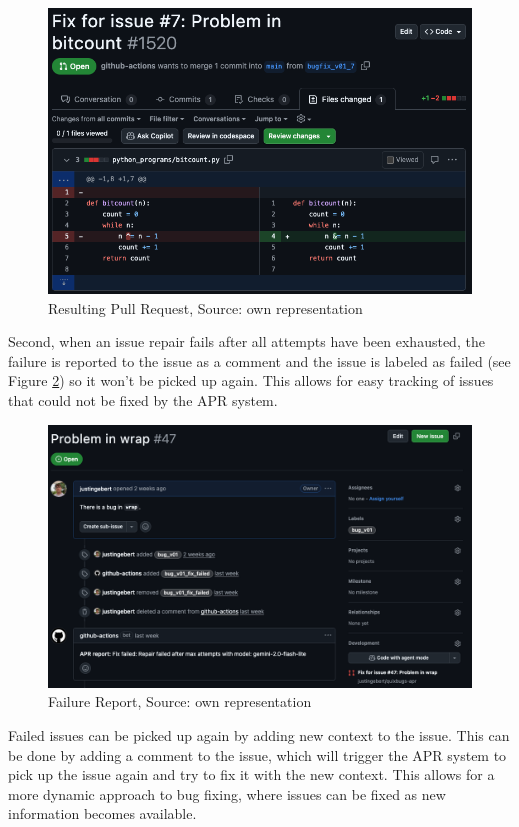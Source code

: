 \begin{figure}[H]
    \centering
    \includegraphics[width=1\textwidth]{images/workflow/pr.png}
    \caption{Resulting Pull Request, Source: own representation}
    \label{fig:pr}
\end{figure}

Second, when an issue repair fails after all attempts have been exhausted, the failure is reported to the issue as a comment and the issue is labeled as failed (see Figure \ref{fig:failure-report}) so it won't be picked up again. This allows for easy tracking of issues that could not be fixed by the APR system.
\begin{figure}[H]
    \centering
    \includegraphics[width=1\textwidth]{images/workflow/failure_comment.png}
    \caption{Failure Report, Source: own representation}
    \label{fig:failure-report}
\end{figure}

Failed issues can be picked up again by adding new context to the issue. This can be done by adding a comment to the issue, which will trigger the APR system to pick up the issue again and try to fix it with the new context. This allows for a more dynamic approach to bug fixing, where issues can be fixed as new information becomes available.

